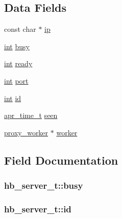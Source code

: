 \subsection*{Data Fields}
\begin{DoxyCompactItemize}
\item 
const char $\ast$ \hyperlink{structhb__server__t_a5eb11e24e399c53661524f7e940ac5f4}{ip}
\item 
\hyperlink{pcre_8txt_a42dfa4ff673c82d8efe7144098fbc198}{int} \hyperlink{structhb__server__t_a3d90149d4d5f6b953606490b47683981}{busy}
\item 
\hyperlink{pcre_8txt_a42dfa4ff673c82d8efe7144098fbc198}{int} \hyperlink{structhb__server__t_a873314deec3d0e76e10574cf15ce0f91}{ready}
\item 
\hyperlink{pcre_8txt_a42dfa4ff673c82d8efe7144098fbc198}{int} \hyperlink{structhb__server__t_ae402b79fe13433c7f6edb70840ff3863}{port}
\item 
\hyperlink{pcre_8txt_a42dfa4ff673c82d8efe7144098fbc198}{int} \hyperlink{structhb__server__t_a58dd6048f15387a3172a730fc93d468c}{id}
\item 
\hyperlink{group__apr__time_gadb4bde16055748190eae190c55aa02bb}{apr\+\_\+time\+\_\+t} \hyperlink{structhb__server__t_a079ec644889d7c4016118adc843d172e}{seen}
\item 
\hyperlink{structproxy__worker}{proxy\+\_\+worker} $\ast$ \hyperlink{structhb__server__t_a2a109b248077b68724230b1e84b1f802}{worker}
\end{DoxyCompactItemize}


\subsection{Field Documentation}
\subsubsection[{\texorpdfstring{busy}{busy}}]{ hb\+\_\+server\+\_\+t\+::busy}\hypertarget{structhb__server__t_a3d90149d4d5f6b953606490b47683981}{}\label{structhb__server__t_a3d90149d4d5f6b953606490b47683981}
\subsubsection[{\texorpdfstring{id}{id}}]{ hb\+\_\+server\+\_\+t\+::id}\hypertarget{structhb__server__t_a58dd6048f15387a3172a730fc93d468c}{}\label{structhb__server__t_a58dd6048f15387a3172a730fc93d468c}
